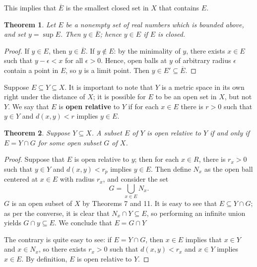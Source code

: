 \documentclass[11pt]{article}
\newtheorem{theorem}{Theorem}
\begin{document}
This implies that $\overline{E}$ is the smallest closed set in $X$ that contains $E$.

\begin{theorem}
	Let $E$ be a nonempty set of real numbers which is bounded above, and set $y = \sup E$. Then $y \in \overline{E}$; hence $y \in E$ if $E$ is closed.
\end{theorem}
\begin{adjustwidth}{1cm}{}
	\begin{proof}
		If $y \in E$, then $y \in \overline{E}$. If $y \notin E$: by the minimality of $y$, there exists $x \in E$ such that $y - \epsilon < x$ for all $\epsilon > 0$. Hence, open balls at $y$ of arbitrary radius $\epsilon$ contain a point in $E$, so $y$ is a limit point. Then $y \in E' \subseteq \overline{E}$.
	\end{proof}
\end{adjustwidth}

Suppose $E \subseteq Y \subseteq X$. It is important to note that $Y$ is a metric space in its own right under the distance of $X$; it is possible for $E$ to be an open set in $X$, but not $Y$. We say that $E$ is \textbf{open relative} to $Y$ if for each $x \in E$ there is $r > 0$ such that $y \in Y$ and $d(x, y) < r$ implies $y \in E$.

\begin{theorem}
	Suppose $Y \subseteq X$. A subset $E$ of $Y$ is open relative to $Y$ if and only if $E = Y \cap G$ for some open subset $G$ of $X$.
\end{theorem}
\begin{adjustwidth}{1cm}{}
	\begin{proof}
		Suppose that $E$ is open relative to $y$; then for each $x \in R$, there is $r_{x} > 0$ such that $y \in Y$ and $d(x, y) < r_{p}$ implies $y \in E$. Then define $N_{x}$ as the open ball centered at $x \in E$ with radius $r_{x}$, and consider the set
		\[
			G = \bigcup\limits_{x \in E} N_{x}.
		\]
		$G$ is an open subset of $X$ by Theorems 7 and 11. It is easy to see that $E \subseteq Y \cap G$; as per the converse, it is clear that $N_{x} \cap Y \subseteq E$, so performing an infinite union yields $G \cap y \subseteq E$. We conclude that $E = G \cap Y$
		

		The contrary is quite easy to see: if $E = Y \cap G$, then $x \in E$ implies that $x \in Y$ and $x \in N_{x}$, so there exists $r_{x} > 0$ such that $d(x, y) < r_{x}$ and $x \in Y$ implies $x \in E$. By definition, $E$ is open relative to $Y$.
	\end{proof}
\end{adjustwidth}
\end{document}
